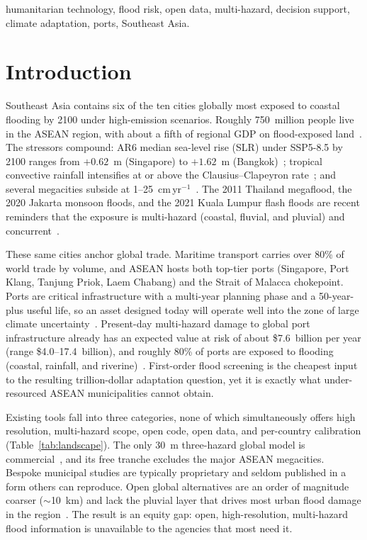 \documentclass[conference]{IEEEtran}
\begin{document}
\begin{IEEEkeywords}
humanitarian technology, flood risk, open data, multi-hazard, decision support, climate adaptation, ports, Southeast Asia.
\end{IEEEkeywords}

\section{Introduction}
Southeast Asia contains six of the ten cities globally most exposed to coastal flooding by 2100 under high-emission scenarios. Roughly 750~million people live in the ASEAN region, with about a fifth of regional GDP on flood-exposed land~\cite{adb2022}. The stressors compound: AR6 median sea-level rise (SLR) under SSP5-8.5 by 2100 ranges from $+0.62$~m (Singapore) to $+1.62$~m (Bangkok)~\cite{ar6}; tropical convective rainfall intensifies at or above the Clausius--Clapeyron rate~\cite{lenderink2017}; and several megacities subside at 1--25~cm\,yr$^{-1}$~\cite{chaussard2013,abidin2011,phienwej2006}. The 2011 Thailand megaflood, the 2020 Jakarta monsoon floods, and the 2021 Kuala Lumpur flash floods are recent reminders that the exposure is multi-hazard (coastal, fluvial, and pluvial) and concurrent~\cite{hallegatte2013,tellman2021}.

These same cities anchor global trade. Maritime transport carries over 80\% of world trade by volume, and ASEAN hosts both top-tier ports (Singapore, Port Klang, Tanjung Priok, Laem Chabang) and the Strait of Malacca chokepoint. Ports are critical infrastructure with a multi-year planning phase and a 50-year-plus useful life, so an asset designed today will operate well into the zone of large climate uncertainty~\cite{jpm_seachange,hanson2020}. Present-day multi-hazard damage to global port infrastructure already has an expected value at risk of about \$7.6~billion per year (range \$4.0--17.4~billion), and roughly 80\% of ports are exposed to flooding (coastal, rainfall, and riverine)~\cite{verschuur2023}. First-order flood screening is the cheapest input to the resulting trillion-dollar adaptation question, yet it is exactly what under-resourced ASEAN municipalities cannot obtain.

Existing tools fall into three categories, none of which simultaneously offers high resolution, multi-hazard scope, open code, open data, and per-country calibration (Table~\ref{tab:landscape}). The only 30~m three-hazard global model is commercial~\cite{wing2024}, and its free tranche excludes the major ASEAN megacities. Bespoke municipal studies are typically proprietary and seldom published in a form others can reproduce. Open global alternatives are an order of magnitude coarser ($\sim$10~km) and lack the pluvial layer that drives most urban flood damage in the region~\cite{hofste2019,ward2020,sutanudjaja2018}. The result is an equity gap: open, high-resolution, multi-hazard flood information is unavailable to the agencies that most need it.
\end{document}
